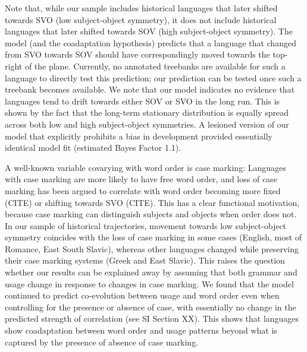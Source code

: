 \documentclass[11pt,a4paper]{article}
\newcommand\comment[1]{{\color{red}#1}}
\newcommand\mhahn[1]{{\color{red}(#1)}}
\begin{document}


Note that, while our sample includes historical languages that later shifted towards SVO (low subject-object symmetry), it does not include historical languages that later shifted towards SOV (high subject-object symmetry).
The model (and the coadaptation hypothesis) predicts that a language that changed from SVO towards SOV should have correspondingly moved towards the top-right of the plane. 
Currently, no annotated treebanks are available for such a language to directly test this prediction; our prediction can be tested once such a treebank becomes available.
We note that our model indicates no evidence that languages tend to drift towards either SOV or SVO in the long run.
This is shown by the fact that the long-term stationary distribution is equally spread across both low and high subject-object symmetries.
A lesioned version of our model that explicitly prohibits a bias in development provided essentially identical model fit (estimated Bayes Factor 1.1).

A well-known variable covarying with word order is case marking: Languages with case marking are more likely to have free word order, and loss of case marking has been argued to correlate with word order becoming more fixed (CITE) or shifting towards SVO (CITE).
This has a clear functional motivation, because case marking can distinguish subjects and objects when order does not.
In our sample of historical trajectories, movement towards low subject-object symmetry coincides with the loss of case marking in some cases (English, most of Romance, East South Slavic), whereas other languages changed while preserving their case marking systems (Greek and East Slavic).
This raises the question whether our results can be explained away by assuming that both grammar and usage change in response to changes in case marking.
We found that the model continued to predict co-evolution between usage and word order even when controlling for the presence or absence of case, with essentially no change in the predicted strength of correlation (see SI Section XX).
This shows that languages show coadaptation between word order and usage patterns beyond what is captured by the presence of absence of case marking.
\end{document}
